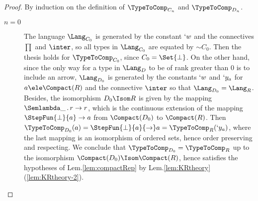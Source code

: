 \documentclass{lmcs}
\begin{document}
 \begin{proof}
By induction on the definition of $\TypeToComp_{C_n}$ and $ \TypeToComp_{D_n}$. 

 \begin{description}

 \item[$n=0$]
The language $\Lang_{C_0}$ is generated by the constant $`w$ and the connectives $\prod $ and $\inter$, so all types in $\Lang_{C_0}$ are equated by $\sim{C_0}$. Then the thesis holds for $\TypeToComp_{C_0}$, since $C_0=\Set{\bot}$. 
On the other hand, since the only way for a type in $\Lang_D$ to be of rank greater than $0$ is to include an arrow, $\Lang_{D_0}$ is generated by the constants $`w$ and $`y_a$ for $a \ele \Compact(R)$ and the connective $\inter$ so that $\Lang_{D_0} = \Lang_R$. 
Besides, the isomorphism $D_0 \Isom R$ is given by the mapping $\Semlambda \_ \, . \, r \to r$, which is the continuous extension of the mapping $\StepFun{\bot }{ a} \to a$ from $\Compact(D_0)$ to $\Compact(R)$. 
Then $\TypeToComp_{D_0}(a) = \StepFun{\bot }{ a} { \to} a = \TypeToComp_R(`y_a)$, 
where the last mapping is an isomorphism of ordered sets, hence order preserving and respecting.
We conclude that $\TypeToComp_{D_0} = \TypeToComp_{R}$ up to the isomorphism $\Compact(D_0) \Isom \Compact(R)$, hence satisfies the hypotheses of Lem.\skp\ref{lem:compactRep} by Lem.\skp\ref{lem:KRtheory}\,(\ref{lem:KRtheory-2}).


\end{description}
\end{proof}
\end{document}
